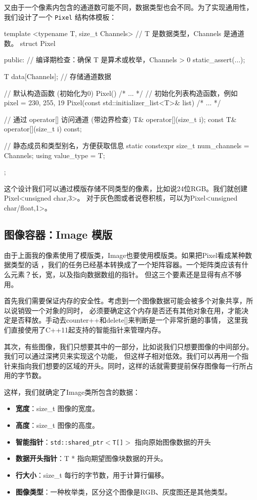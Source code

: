 \documentclass[11pt]{article}
\begin{document}
又由于一个像素内包含的通道数可能不同，数据类型也会不同。为了实现通用性，我们设计了一个 \texttt{Pixel} 结构体模板：
\begin{codeline}
template <typename T, size_t Channels> // T 是数据类型，Channels 是通道数。
struct Pixel {            
public:
    // 编译期检查：确保 T 是算术或枚举，Channels > 0
    static_assert(...);

    T data[Channels]; // 存储通道数据

    // 默认构造函数 (初始化为0)
    Pixel() { /* ... */ }
    // 初始化列表构造函数，例如 pixel = {230, 255, 19}
    Pixel(const std::initializer_list<T>& list) { /* ... */ }

    // 通过 operator[] 访问通道 (带边界检查)
    T& operator[](size_t i);
    const T& operator[](size_t i) const;

    // 静态成员和类型别名，方便获取信息
    static constexpr size_t num_channels = Channels;
    using value_type = T;
};
\end{codeline}
这个设计我们可以通过模版存储不同类型的像素，比如说24位RGB。我们就创建Pixel<unsigned char,3>。
对于灰色图或者说卷积核，可以为Pixel<unsigned char/float,1>。

\subsection{图像容器：Image 模版}
由于上面我的像素使用了模版类，Image也要使用模版类。如果把Pixel看成某种数据类型的话
，我们的任务已经基本转换成了一个矩阵容器。一个矩阵类应该有什么元素？长，宽，以及指向数据数组的指针。
但这三个要素还是显得有点不够用。


首先我们需要保证内存的安全性。考虑到一个图像数据可能会被多个对象共享，所以说销毁一个对象的同时，
必须要确定这个内存是否还有其他对象在用，才能决定是否释放。手动去counter++和delete[]来判断是一个非常折磨的事情，
这里我们直接使用了C++11起支持的智能指针来管理内存。


其次，有些图像，我们只想要其中的一部分，比如说我们只想要图像的中间部分。我们可以通过深拷贝来实现这个功能，
但这样子相对低效。我们可以再用一个指针来指向我们想要的区域的开头。同时，这样的话就需要提前保存图像每一行所占用的字节数。


这样，我们就确定了Image类所包含的数据：
\begin{itemize}
  \item \textbf{宽度}：size\_t 图像的宽度。
  \item \textbf{高度}：size\_t 图像的高度。
  \item \textbf{智能指针}：\texttt{std::shared\_ptr$<$T[]$>$} 指向原始图像数据的开头
  \item \textbf{数据开头指针}：T * 指向期望图像块数据的开头。
  \item \textbf{行大小}：size\_t 每行的字节数，用于计算行偏移。
  \item \textbf{图像类型}：一种枚举类，区分这个图像是RGB、灰度图还是其他类型。
\end{itemize}
\end{document}
